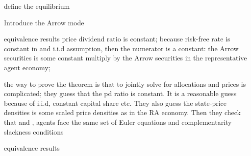 \begin{frame}
define the equilibrium
\end{frame}
\begin{frame}
Introduce the Arrow mode
\end{frame}
\begin{frame}{equivalence results}
price dividend ratio is constant; because risk-free rate is constant in \bewley and i.i.d assumption, then the numerator is a constant: the Arrow securities is some constant multiply by the Arrow securities in the representative agent economy; 

the way to prove the theorem is that to jointly solve for allocations and prices is complicated; they guess that the pd ratio is constant. It is a reasonable guess because of i.i.d, constant capital share etc. They also guess the state-price densities is some scaled price densities as in the RA economy. Then they check that \bewley and \arrow, agents face the same set of Euler equations and complementarity slackness conditions
\end{frame}
\begin{frame}{equivalence results}

\end{frame}


